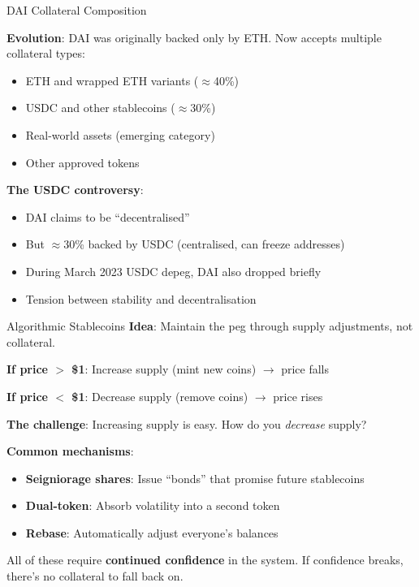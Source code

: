 \documentclass[10pt]{beamer}
\newcommand{\highlight}[1]{\textcolor{AccentOrange}{\textbf{#1}}}
\begin{document}
\begin{frame}{DAI Collateral Composition}
  
  \textbf{Evolution}: DAI was originally backed only by ETH. Now accepts multiple collateral types:
  
  \vspace{0.5em}
  \begin{itemize}
    \item ETH and wrapped ETH variants ($\approx$40\%)
    \item USDC and other stablecoins ($\approx$30\%)
    \item Real-world assets (emerging category)
    \item Other approved tokens
  \end{itemize}
  
  \vspace{1em}
  \textbf{The USDC controversy}:
  \begin{itemize}
    \item DAI claims to be ``decentralised''
    \item But $\approx$30\% backed by USDC (centralised, can freeze addresses)
    \item During March 2023 USDC depeg, DAI also dropped briefly
    \item Tension between stability and decentralisation
  \end{itemize}
\end{frame}


\begin{frame}{Algorithmic Stablecoins}
  \textbf{Idea}: Maintain the peg through supply adjustments, not collateral.
  
  \vspace{1em}
  \textbf{If price $>$ \$1}: Increase supply (mint new coins) $\rightarrow$ price falls
  
  \textbf{If price $<$ \$1}: Decrease supply (remove coins) $\rightarrow$ price rises
  
  \vspace{1em}
  \textbf{The challenge}: Increasing supply is easy. How do you \textit{decrease} supply?
  
  \vspace{1em}
  \textbf{Common mechanisms}:
  \begin{itemize}
    \item \textbf{Seigniorage shares}: Issue ``bonds'' that promise future stablecoins
    \item \textbf{Dual-token}: Absorb volatility into a second token
    \item \textbf{Rebase}: Automatically adjust everyone's balances
  \end{itemize}
  
  \vspace{1em}
  All of these require \highlight{continued confidence} in the system. If confidence breaks, there's no collateral to fall back on.
\end{frame}
\end{document}
